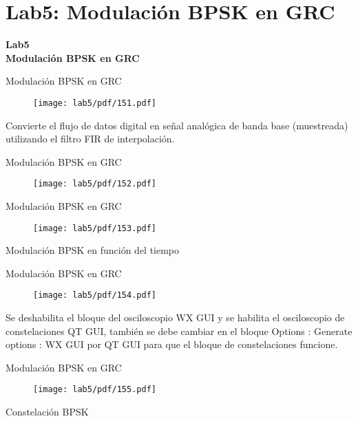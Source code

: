 \section{Lab5: Modulación BPSK en GRC}

\begin{frame}{}


\bfseries{\textrm{\LARGE Lab5\\ \Large Modulación BPSK en GRC}}
\raggedright
\end{frame}


\begin{frame}{Modulación BPSK en GRC}



\begin{figure}
  \centering
   \texttt{[image: lab5/pdf/151.pdf]}
  \end{figure}
Convierte el flujo de datos digital en señal analógica de banda base (muestreada) utilizando el filtro FIR de interpolación.
\end{frame}

\begin{frame}{Modulación BPSK en GRC}
\begin{figure}[H]
\centering
\texttt{[image: lab5/pdf/152.pdf]}
\end{figure}
\end{frame}

\begin{frame}{Modulación BPSK en GRC}
\begin{figure}
  \centering
   \texttt{[image: lab5/pdf/153.pdf]}
  \end{figure}
  \centering
Modulación BPSK en función del tiempo
\end{frame}

\begin{frame}{Modulación BPSK en GRC}
\begin{figure}
  \centering
   \texttt{[image: lab5/pdf/154.pdf]}
  \end{figure}
Se deshabilita el bloque del osciloscopio WX GUI y se habilita el
osciloscopio de constelaciones QT GUI, también se debe cambiar
en el bloque Options : Generate options : WX GUI por QT GUI
para que el bloque de constelaciones funcione.
\end{frame}

\begin{frame}{Modulación BPSK en GRC}
\begin{figure}
  \centering
   \texttt{[image: lab5/pdf/155.pdf]}
  \end{figure}
  \centering
Constelación BPSK
\end{frame}